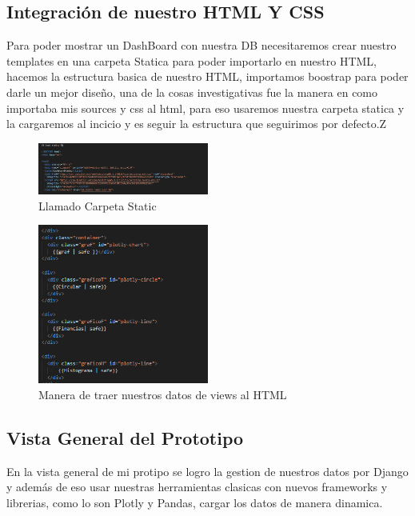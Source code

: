 \documentclass[conference]{IEEEtran}
\begin{document}
\subsection{Integración de nuestro HTML Y CSS}
Para poder mostrar un DashBoard con nuestra DB necesitaremos crear nuestro templates en una carpeta Statica para poder importarlo en nuestro HTML, hacemos la estructura basica de nuestro HTML, importamos boostrap para poder darle un mejor diseño, una de la cosas investigativas fue la manera en como importaba mis sources y css al html, para eso usaremos nuestra carpeta statica y la cargaremos al incicio y es seguir la estructura que seguirimos por defecto.Z
\begin{figure}[h] %
    \centering
    \includegraphics[width=0.5\textwidth]{images/Static .png} %
    \caption{Llamado Carpeta Static}
    \label{fig:mi_imagen}
\end{figure}

\begin{figure}[h] %
    \centering
    \includegraphics[width=0.5\textwidth]{images/Llamado Views.png} %
    \caption{Manera de traer nuestros datos de views al HTML}
    \label{fig:mi_imagen}
\end{figure}

\subsection{Vista General del Prototipo}
En la vista general de mi protipo se logro la gestion de nuestros datos por Django y además de eso usar nuestras herramientas clasicas con nuevos frameworks y librerias, como lo son Plotly y Pandas, cargar los datos de manera dinamica.
\end{document}
